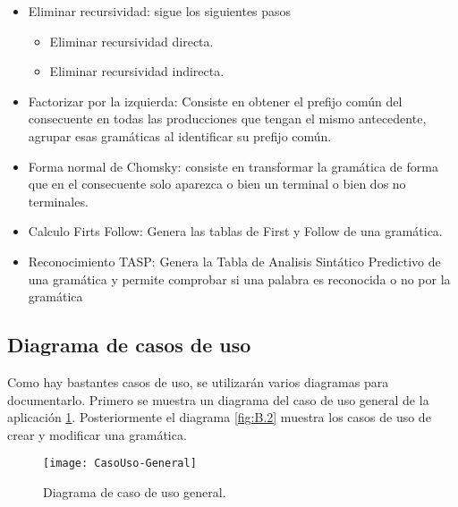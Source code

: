 \begin{itemize}
\item Eliminar recursividad: sigue los siguientes pasos
\begin{itemize}
	\item Eliminar recursividad directa.
	\item Eliminar recursividad indirecta.
\end{itemize}

\item Factorizar por la izquierda: Consiste en obtener el prefijo común del
consecuente en todas las producciones que tengan el mismo antecedente,
agrupar esas gramáticas al identificar su prefijo común.
\item Forma normal de Chomsky: consiste en transformar la gramática de forma
que en el consecuente solo aparezca o bien un terminal o bien dos no
terminales.
\item Calculo Firts Follow: Genera las tablas de First y Follow de una gramática.
\item Reconocimiento TASP: Genera la Tabla de Analisis Sintático Predictivo de una gramática y permite comprobar si una palabra es reconocida o no por la gramática
\end{itemize}

\subsection{Diagrama de casos de uso}

Como hay bastantes casos de uso, se utilizarán varios diagramas para documentarlo. Primero se muestra un diagrama del caso de uso general de la aplicación \ref{fig:B.1}. Posteriormente el diagrama \ref{fig:B.2} muestra los casos de uso de crear y modificar una gramática.

\begin{figure}[h]
\centering
\texttt{[image: CasoUso-General]}
\caption{Diagrama de caso de uso general.}
\label{fig:B.1}
\end{figure}



